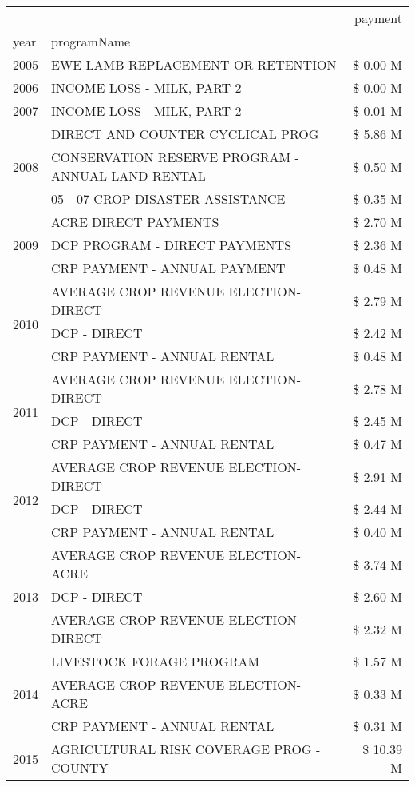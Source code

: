 \begin{tabular}{llr}
\toprule
 &  & payment \\
year & programName &  \\
\midrule
2005 & EWE LAMB REPLACEMENT OR RETENTION & \$ 0.00 M \\
\cline{1-3}
2006 & INCOME LOSS - MILK, PART 2 & \$ 0.00 M \\
\cline{1-3}
2007 & INCOME LOSS - MILK, PART 2 & \$ 0.01 M \\
\cline{1-3}
\multirow[t]{3}{*}{2008} & DIRECT AND COUNTER CYCLICAL PROG & \$ 5.86 M \\
 & CONSERVATION RESERVE PROGRAM - ANNUAL LAND RENTAL & \$ 0.50 M \\
 & 05 - 07 CROP DISASTER ASSISTANCE & \$ 0.35 M \\
\cline{1-3}
\multirow[t]{3}{*}{2009} & ACRE DIRECT PAYMENTS & \$ 2.70 M \\
 & DCP PROGRAM - DIRECT PAYMENTS & \$ 2.36 M \\
 & CRP PAYMENT - ANNUAL PAYMENT & \$ 0.48 M \\
\cline{1-3}
\multirow[t]{3}{*}{2010} & AVERAGE CROP REVENUE ELECTION-DIRECT & \$ 2.79 M \\
 & DCP - DIRECT & \$ 2.42 M \\
 & CRP PAYMENT - ANNUAL RENTAL & \$ 0.48 M \\
\cline{1-3}
\multirow[t]{3}{*}{2011} & AVERAGE CROP REVENUE ELECTION-DIRECT & \$ 2.78 M \\
 & DCP - DIRECT & \$ 2.45 M \\
 & CRP PAYMENT - ANNUAL RENTAL & \$ 0.47 M \\
\cline{1-3}
\multirow[t]{3}{*}{2012} & AVERAGE CROP REVENUE ELECTION-DIRECT & \$ 2.91 M \\
 & DCP - DIRECT & \$ 2.44 M \\
 & CRP PAYMENT - ANNUAL RENTAL & \$ 0.40 M \\
\cline{1-3}
\multirow[t]{3}{*}{2013} & AVERAGE CROP REVENUE ELECTION-ACRE & \$ 3.74 M \\
 & DCP - DIRECT & \$ 2.60 M \\
 & AVERAGE CROP REVENUE ELECTION-DIRECT & \$ 2.32 M \\
\cline{1-3}
\multirow[t]{3}{*}{2014} & LIVESTOCK FORAGE PROGRAM & \$ 1.57 M \\
 & AVERAGE CROP REVENUE ELECTION-ACRE & \$ 0.33 M \\
 & CRP PAYMENT - ANNUAL RENTAL & \$ 0.31 M \\
\cline{1-3}
\multirow[t]{3}{*}{2015} & AGRICULTURAL RISK COVERAGE PROG - COUNTY & \$ 10.39 M \\

\end{tabular}
